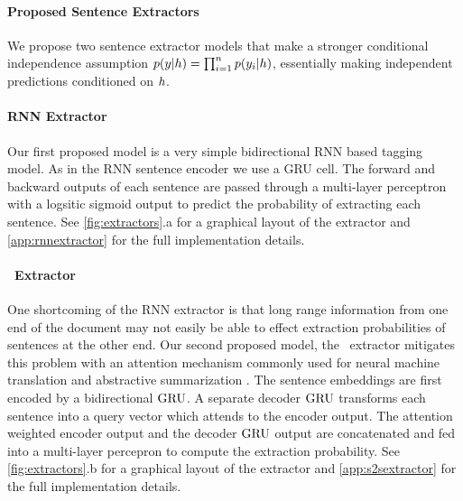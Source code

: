 \paragraph{Proposed Sentence Extractors}
We propose two sentence extractor models that 
make a stronger conditional independence 
assumption $p(\slabel|\sentEmb)=\prod_{i=1}^\docSize p(\slabel[i]|\sentEmb)$,
essentially making independent predictions conditioned on $\sentEmb$.

\paragraph{RNN Extractor}
    Our first proposed model is a very simple bidirectional
RNN based tagging model. As in the RNN sentence encoder we use a GRU cell.
The forward and backward outputs of each sentence are passed through a 
multi-layer perceptron with a logsitic sigmoid output 
to predict the probability
of extracting each sentence. 
See \autoref{fig:extractors}.a for a graphical layout of the extractor
and \autoref{app:rnnextractor} for the full implementation details.


\paragraph{\sts~Extractor} One shortcoming of the RNN extractor is that long range
information from one end of the document may not easily be able to effect 
extraction probabilities of sentences at the other end. 
Our second proposed model, the \sts~extractor mitigates this problem with an 
attention 
mechanism commonly
used for neural machine translation \cite{bahdanau2014neural} and 
abstractive summarization \cite{see2017get}. 
The sentence embeddings are first
encoded by a bidirectional $\operatorname{GRU}$. A separate decoder $\operatorname{GRU}$ transforms each 
sentence into a query vector which attends to the encoder output. The
attention weighted encoder output and the decoder $\operatorname{GRU}$ output are concatenated
and fed into a multi-layer percepron to compute the extraction probability.
See \autoref{fig:extractors}.b for a graphical layout of the extractor
and \autoref{app:s2sextractor} for the full implementation details.

